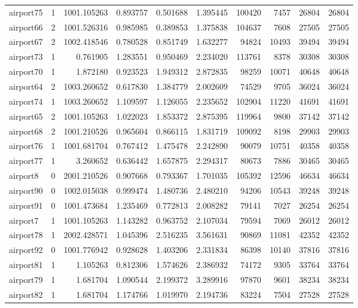 \begin{longtable}{|l|r|r|r|r|r|r|r|r|r|}
airport75 & 1 & 1001.105263 & 0.893757 & 0.501688 & 1.395445 & 100420 & 7457 & 26804 & 26804 \\
airport66 & 2 & 1001.526316 & 0.985985 & 0.389853 & 1.375838 & 104637 & 7608 & 27505 & 27505 \\
airport67 & 2 & 1002.418546 & 0.780528 & 0.851749 & 1.632277 & 94824 & 10493 & 39494 & 39494 \\
airport73 & 1 & 0.761905 & 1.283551 & 0.950469 & 2.234020 & 113761 & 8378 & 30308 & 30308 \\
airport70 & 1 & 1.872180 & 0.923523 & 1.949312 & 2.872835 & 98259 & 10071 & 40648 & 40648 \\
airport64 & 2 & 1003.260652 & 0.617830 & 1.384779 & 2.002609 & 74529 & 9705 & 36024 & 36024 \\
airport74 & 1 & 1003.260652 & 1.109597 & 1.126055 & 2.235652 & 102904 & 11220 & 41691 & 41691 \\
airport65 & 2 & 1001.105263 & 1.022023 & 1.853372 & 2.875395 & 119964 & 9800 & 37142 & 37142 \\
airport68 & 2 & 1001.210526 & 0.965604 & 0.866115 & 1.831719 & 109092 & 8198 & 29903 & 29903 \\
airport76 & 1 & 1001.681704 & 0.767412 & 1.475478 & 2.242890 & 90079 & 10751 & 40358 & 40358 \\
airport77 & 1 & 3.260652 & 0.636442 & 1.657875 & 2.294317 & 80673 & 7886 & 30465 & 30465 \\
airport8 & 0 & 2001.210526 & 0.907668 & 0.793367 & 1.701035 & 105392 & 12596 & 46634 & 46634 \\
airport90 & 0 & 1002.015038 & 0.999474 & 1.480736 & 2.480210 & 94206 & 10543 & 39248 & 39248 \\
airport91 & 0 & 1001.473684 & 1.235469 & 0.772813 & 2.008282 & 79141 & 7027 & 26254 & 26254 \\
airport7 & 1 & 1001.105263 & 1.143282 & 0.963752 & 2.107034 & 79594 & 7069 & 26012 & 26012 \\
airport78 & 1 & 2002.428571 & 1.045396 & 2.516235 & 3.561631 & 90869 & 11081 & 42352 & 42352 \\
airport92 & 0 & 1001.776942 & 0.928628 & 1.403206 & 2.331834 & 86398 & 10140 & 37816 & 37816 \\
airport81 & 1 & 1.105263 & 0.812306 & 1.574626 & 2.386932 & 74172 & 9305 & 33764 & 33764 \\
airport79 & 1 & 1.681704 & 1.090544 & 2.199372 & 3.289916 & 97870 & 9601 & 38234 & 38234 \\
airport82 & 1 & 1.681704 & 1.174766 & 1.019970 & 2.194736 & 83224 & 7504 & 27528 & 27528 \\

\end{longtable}
